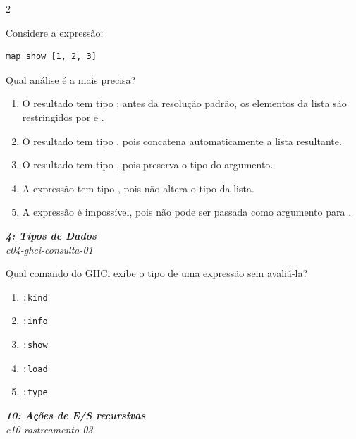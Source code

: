\documentclass[a4paper,10pt,brazil]{article}
\begin{document}
\begin{multicols}{2}
\begin{flushright}
\end{flushright}
Considere a expressão:

\begin{verbatim}
map show [1, 2, 3]
\end{verbatim}

Qual análise é a mais precisa?

\begin{enumerate}
  \item O resultado tem tipo \haskellinline{[String]}; antes da resolução padrão, os elementos da lista são restringidos por  e .
  \item O resultado tem tipo , pois  concatena automaticamente a lista resultante.
  \item O resultado tem tipo \haskellinline{[Int]}, pois  preserva o tipo do argumento.
  \item A expressão tem tipo , pois  não altera o tipo da lista.
  \item A expressão é impossível, pois  não pode ser passada como argumento para .

\end{enumerate}

\begin{flushright}
  \footnotesize
  \textit{\textbf{4: Tipos de Dados}}\\
  \textit{c04-ghci-consulta-01}\\

\end{flushright}
Qual comando do GHCi exibe o tipo de uma expressão sem avaliá-la?

\begin{enumerate}
  \item \texttt{:kind}

  \item \texttt{:info}

  \item \texttt{:show}

  \item \texttt{:load}

  \item \texttt{:type}


\end{enumerate}

\begin{flushright}
  \footnotesize
  \textit{\textbf{10: Ações de E/S recursivas}}\\
  \textit{c10-rastreamento-03}\\


\end{flushright}
\end{multicols}
\end{document}
